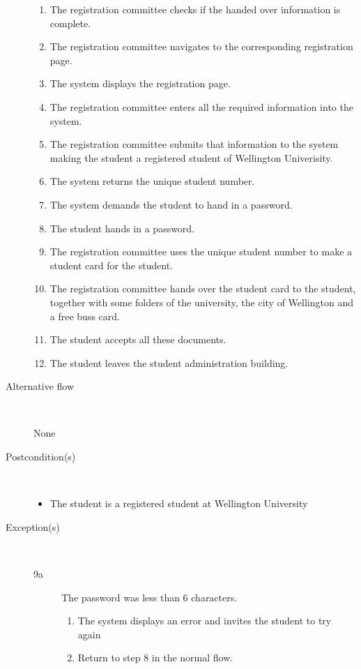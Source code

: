 \begin{description}
\begin{enumerate}
	  	\item The registration committee checks if the handed over information is
	  	complete.
	  	\item The registration committee navigates to the corresponding registration
	  	page.
	  	\item The system displays the registration page.
	  	\item The registration committee enters all the required information into
	  	the system.
	  	\item The registration committee submits that information to the system
	  	making the student a registered student of Wellington Univerisity.
	  	\item The system returns the unique student number.
	  	\item The system demands the student to hand in a password. 
	  	\item The student hands in a password.
	  	\item The registration committee uses the unique student number to make a
	  	student card for the student.
	  	\item The registration committee hands over the student card to the student,
	  	together with some folders of the university, the city of Wellington and a
	  	free buss card.
	  	\item The student accepts all these documents.
	  	\item The student leaves the student administration building.
	\end{enumerate}
	\item[Alternative flow] \
		\par None
	\item[Postcondition(s)] \ 
	\begin{itemize}
		\item The student is a registered student at Wellington University
	\end{itemize}
	\item[Exception(s)] \ 
		\begin{description}
			\item[9a] The password was less than 6 characters.
			\begin{enumerate}
			  \item The system displays an error and invites the student to try again
			  \item Return to step 8 in the normal flow.
			\end{enumerate}
		\end{description}
			
\end{description}
